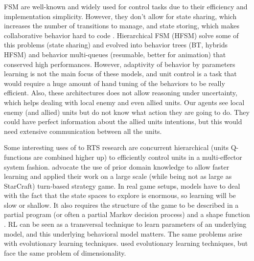 FSM are well-known and widely used for control tasks due to their efficiency and implementation simplicity. However, they don't allow for state sharing, which increases the number of transitions to manage, and state storing, which makes collaborative behavior hard to code \citep{Cutumisu09}. Hierarchical FSM (HFSM) solve some of this problems (state sharing) and evolved into behavior trees (BT, hybrids HFSM) \citep{Isla} and behavior multi-queues (resumable, better for animation) \citep{Cutumisu09} that conserved high performances. %
However, adaptivity of behavior by parameters learning is not the main focus of these models, and unit control is a task that would require a huge amount of hand tuning of the behaviors to be really efficient. 
Also, these architectures does not allow reasoning under uncertainty, which helps dealing with local enemy and even allied units. Our agents see local enemy (and allied) units but do not know what action they are going to do. They could have perfect information about the allied units intentions, but this would need extensive communication between all the units.

Some interesting uses of  \citep{Sutton} to RTS research are concurrent hierarchical (units Q-functions are combined higher up)  \citep{Marthi05concurrenthierarchical} to efficiently control units in a multi-effector system fashion. \cite{Madeira06} advocate the use of prior domain knowledge to allow faster  learning and applied their work on a large scale (while being not as large as StarCraft) turn-based strategy game. In real game setups,  models have to deal with the fact that the state spaces to explore is enormous, so learning will be slow or shallow. It also requires the structure of the game to be described in a partial program (or often a partial Markov decision process) and a shape function \citep{Marthi05concurrenthierarchical}. RL can be seen as a transversal technique to learn parameters of an underlying model, and this underlying behavioral model matters. The same problems arise with evolutionary learning techniques. \cite{GA} used evolutionary learning techniques, but face the same problem of dimensionality. 

